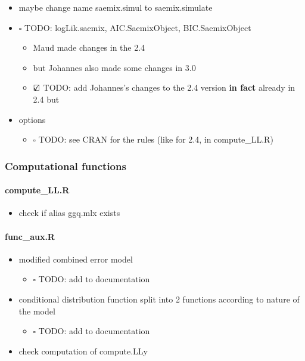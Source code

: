 \documentclass[
]{article}
\providecommand{\tightlist}{%
  \setlength{\itemsep}{0pt}\setlength{\parskip}{0pt}}
\begin{document}
\begin{itemize}
\tightlist
\item
  maybe change name saemix.simul to saemix.simulate
\item
  \(\square\) TODO: logLik.saemix, AIC.SaemixObject, BIC.SaemixObject

  \begin{itemize}
  \tightlist
  \item
    Maud made changes in the 2.4
  \item
    but Johannes also made some changes in 3.0
  \item
    \(\text{\rlap{$\checkmark$}}\square\) TODO: add Johannes's changes
    to the 2.4 version \textbf{in fact} already in 2.4 but
  \end{itemize}
\item
  options

  \begin{itemize}
  \tightlist
  \item
    \(\square\) TODO: see CRAN for the rules (like for 2.4, in
    compute\_LL.R)
  \end{itemize}
\end{itemize}

\hypertarget{computational-functions}{%
\subsubsection{Computational functions}\label{computational-functions}}

\hypertarget{compute_ll.r}{%
\paragraph{compute\_LL.R}\label{compute_ll.r}}

\begin{itemize}
\tightlist
\item
  check if alias ggq.mlx exists
\end{itemize}

\hypertarget{func_aux.r}{%
\paragraph{func\_aux.R}\label{func_aux.r}}

\begin{itemize}
\tightlist
\item
  modified combined error model

  \begin{itemize}
  \tightlist
  \item
    \(\square\) TODO: add to documentation
  \end{itemize}
\item
  conditional distribution function split into 2 functions according to
  nature of the model

  \begin{itemize}
  \tightlist
  \item
    \(\square\) TODO: add to documentation
  \end{itemize}
\item
  check computation of compute.LLy
\end{itemize}
\end{document}
